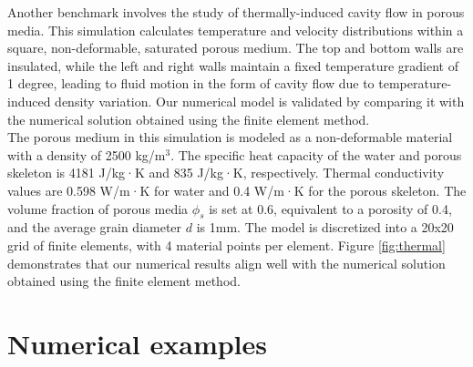 \documentclass[preprint,12pt]{elsarticle}
\begin{document}
%
%
Another benchmark involves the study of thermally-induced cavity flow in porous media. This simulation calculates temperature and velocity distributions within a square, non-deformable, saturated porous medium. The top and bottom walls are insulated, while the left and right walls maintain a fixed temperature gradient of 1 degree, leading to fluid motion in the form of cavity flow due to temperature-induced density variation. Our numerical model is validated by comparing it with the numerical solution obtained using the finite element method.\\
The porous medium in this simulation is modeled as a non-deformable material with a density of 2500 kg/m$^{3}$. The specific heat capacity of the water and porous skeleton is 4181 J/kg·K and 835 J/kg·K, respectively. Thermal conductivity values are 0.598 W/m·K for water and 0.4 W/m·K for the porous skeleton. The volume fraction of porous media $\phi_s$ is set at 0.6, equivalent to a porosity of 0.4, and the average grain diameter $d$ is 1mm. The model is discretized into a 20x20 grid of finite elements, with 4 material points per element. Figure \ref{fig:thermal} demonstrates that our numerical results align well with the numerical solution obtained using the finite element method.
\section{\textsf{Numerical examples}}
\end{document}
